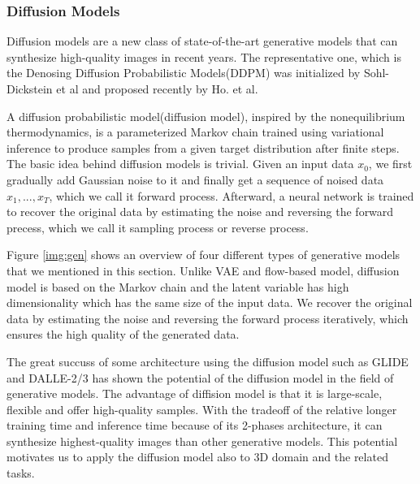 \documentclass[12pt,DIV14,BCOR12mm,a4paper,footinclude=false,headinclude,parskip=half-,twoside,openright,cleardoublepage=empty,toc=index,bibliography=totoc,listof=totoc]{scrreprt}
\numberwithin{equation}{chapter}
\begin{document}
\subsubsection{Diffusion Models}
Diffusion models are a new class of state-of-the-art generative models that can synthesize high-quality images in recent years. The representative one, which is the Denosing Diffusion Probabilistic Models(DDPM) was initialized by Sohl-Dickstein et al\cite{sohldickstein2015deep} and proposed recently by Ho. et al\cite{ho2020denoising}. 

A diffusion probabilistic model(diffusion model), inspired by the nonequilibrium thermodynamics, is a parameterized Markov chain trained using variational inference to produce samples from a given target distribution after finite steps. The basic idea behind diffusion models is trivial. Given an input data $x_{0}$, we first gradually add Gaussian noise to it and finally get a sequence of noised data $x_{1},...,x_{T}$, which we call it forward process. Afterward, a neural network is trained to recover the original data by estimating the noise and reversing the forward precess, which we call it sampling process or reverse process.

Figure \ref{img:gen} shows an overview of four different types of generative models that we mentioned in this section. Unlike VAE and flow-based model, diffusion model is based on the Markov chain and the latent variable has high dimensionality which has the same size of the input data. We recover the original data by estimating the noise and reversing the forward process iteratively, which ensures the high quality of the generated data.

The great succuss of some architecture using the diffusion model such as GLIDE\cite{nichol2022glide} and DALLE-2/3\cite{ramesh2022hierarchical} has shown the potential of the diffusion model in the field of generative models. The advantage of diffision model is that it is large-scale, flexible and offer high-quality samples. With the tradeoff of the relative longer training time and inference time because of its 2-phases architecture, it can synthesize highest-quality images than other generative models. This potential motivates us to apply the diffusion model also to 3D domain and the related tasks.
\end{document}
